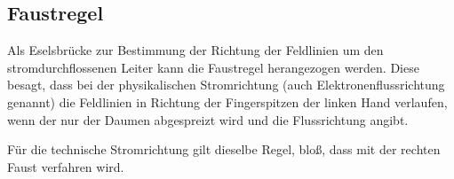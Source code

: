 




%
%	





\subsection{Faustregel}	\label{subsec:Faustregel}

Als Eselsbrücke zur Bestimmung der Richtung der Feldlinien um den stromdurchflossenen Leiter kann die \glqq Faustregel\grqq{} herangezogen werden. Diese besagt, dass bei der physikalischen Stromrichtung (auch Elektronenflussrichtung genannt) die Feldlinien in Richtung der Fingerspitzen der linken Hand verlaufen, wenn der nur der Daumen abgespreizt wird und die Flussrichtung angibt.

Für die technische Stromrichtung gilt dieselbe Regel, bloß, dass mit der rechten Faust verfahren wird.

